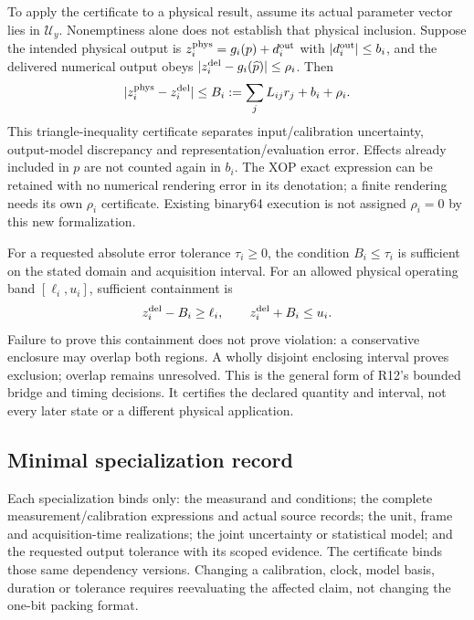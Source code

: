 To apply the certificate to a physical result, assume its actual parameter
vector lies in $\mathcal U_y$. Nonemptiness alone does not establish that
physical inclusion. Suppose the intended physical output is
$z_i^{\rm phys}=g_i(p)+d_i^{\rm out}$ with
$|d_i^{\rm out}|\leq b_i$, and the delivered numerical output obeys
$|z_i^{\rm del}-g_i(\widehat p)|\leq\rho_i$. Then
\begin{equation}
 |z_i^{\rm phys}-z_i^{\rm del}|\leq
 B_i:=\sum_jL_{ij}r_j+b_i+\rho_i.
 \label{r13-measurement-total-bound}
\end{equation}
This triangle-inequality certificate separates input/calibration uncertainty,
output-model discrepancy and representation/evaluation error. Effects already
included in $p$ are not counted again in $b_i$. The XOP exact expression can
be retained with no numerical rendering error in its denotation; a finite
rendering needs its own $\rho_i$ certificate. Existing binary64 execution is
not assigned $\rho_i=0$ by this new formalization.

For a requested absolute error tolerance $\tau_i\geq0$, the condition
$B_i\leq\tau_i$ is sufficient on the stated domain and acquisition interval.
For an allowed physical operating band $[\ell_i,u_i]$, sufficient containment is
\begin{equation}
 z_i^{\rm del}-B_i\geq\ell_i,\qquad
 z_i^{\rm del}+B_i\leq u_i.
 \label{r13-measurement-tolerance}
\end{equation}
Failure to prove this containment does not prove violation: a conservative
enclosure may overlap both regions. A wholly disjoint enclosing interval
proves exclusion; overlap remains unresolved. This is the general form of
R12's bounded bridge and timing decisions. It certifies the declared quantity
and interval, not every later state or a different physical application.

\subsection{Minimal specialization record}
\label{r13-measurement-record}

Each specialization binds only: the measurand and conditions; the complete
measurement/calibration expressions and actual source records; the unit,
frame and acquisition-time realizations; the joint uncertainty or statistical
model; and the requested output tolerance with its scoped evidence. The
certificate binds those same dependency versions. Changing a calibration,
clock, model basis, duration or tolerance requires reevaluating the affected
claim, not changing the one-bit packing format.

